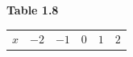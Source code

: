 {{\begin{center}
\begin{tabular}[t]{|l|l|l|l|l|l|}
     \tabularnewline\cline{1-1}\cline{2-2}\cline{3-3}\cline{4-4}\cline{5-5}\cline{6-6}
    \end{tabular}
      \end{center}
    \begin{center}{\small\bfseries Table 1.8}\end{center}
          }{ %
        \begin{center}
      \label{m39345*id240930}
    \noindent
      \tablelasttail{}
      \begin{xtabular}[t]{|l|l|l|l|l|l|}\hline
                  $x$
                 &
                  $-2$
                 &
                  $-1$
                 &
                  $0$
                 &
                  $1$
                 &
                  $2$
     \tabularnewline{}

\end{xtabular}
\end{center}}}
